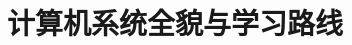 \documentclass[../../main.tex]{subfiles}
\begin{document}
\chapter{计算机系统全貌与学习路线}
\label{ch:01-system-overview}





\end{document}
